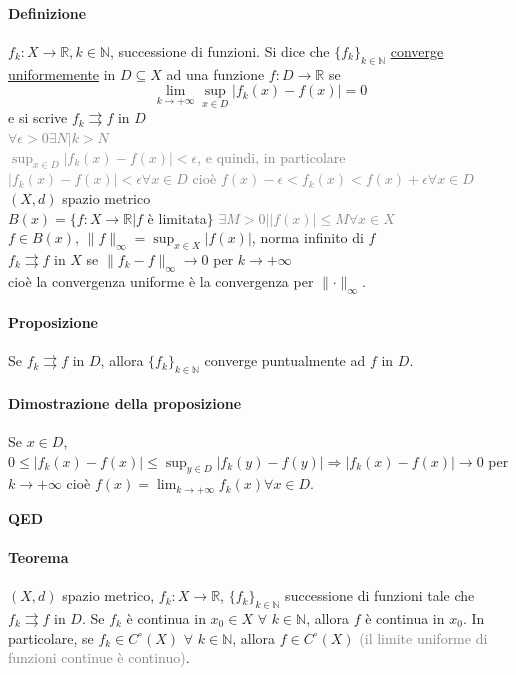 \documentclass{article}
\newcommand{\R}{\mathbb{R}}
\newcommand{\N}{\mathbb{N}}
\begin{document}
\paragraph{{Definizione}}
$f_k:X \rightarrow \R, k \in \N$, successione di funzioni. Si dice che $\{ f_k\}_{k\in\N}$ \underline{converge} \underline{uniformemente} in $D \subseteq X$ ad una funzione $f: D\rightarrow \R$ se 
\begin{equation*}
    \lim_{k\rightarrow+\infty}\sup_{x\in D}|f_k(x)-f(x)|=0
\end{equation*}
e si scrive $f_k \rightrightarrows f$ in $D$\\
\textcolor{grey}{$\forall \epsilon >0 \exists N | k >N$\\ 
$\sup_{x\in D}|f_k(x)-f(x)| <\epsilon$, e quindi, in particolare $|f_k(x)-f(x)|<\epsilon \forall x \in D$ cioè $f(x)-\epsilon <f_k(x)<f(x)+\epsilon \forall x \in D$}\\
$(X,d)$ spazio metrico\\
$B(x)=\{f:X \rightarrow \R | f$ è limitata$\}$ \textcolor{grey}{$\exists M >0 | |f(x)| \leq M \forall x \in X$}\\
$f\in B(x)$, $\parallel f \parallel_\infty =\sup_{x\in X}|f(x)|$, norma infinito di $f$\\
$f_k \rightrightarrows f$ in $X$ se $\parallel f_k - f \parallel_\infty \rightarrow 0$ per $k \rightarrow +\infty$\\
cioè la convergenza uniforme è la convergenza per $\parallel \cdot \parallel_\infty$.

\paragraph{{Proposizione}}
Se $f_k \rightrightarrows f$ in $ D $, allora $\{ f_k \}_{k \in \N}$ converge puntualmente ad $f$ in $D$.

\paragraph{{Dimostrazione della proposizione}}
Se $x \in D$, $0 \leq |f_k(x) -f(x)| \leq \sup_{y\in D}|f_k(y)-f(y)| \Rightarrow |f_k(x)-f(x)|\rightarrow 0$ per $ k \rightarrow +\infty$ cioè $f(x)=\lim_{k \rightarrow +\infty} f_k (x) \forall x \in D$.
\begin{flushright}
\textbf{QED}
\end{flushright}

\paragraph{Teorema}
$(X,d)$ spazio metrico, $f_k:X \rightarrow \R$, $\{f_k\}_{k \in \N}$ successione di funzioni tale che $f_k \rightrightarrows f$ in $D$. Se $f_k$ è continua in $x_0 \in X \,\, \forall\,\, k \in \N$, allora $f$ è continua in $x_0$. In particolare, se $f_k \in C^\circ(X)\,\, \forall \,\, k \in \N$, allora $f \in C^\circ(X)$ \textcolor{grey}{(il limite uniforme di funzioni continue è continuo)}.
\end{document}
